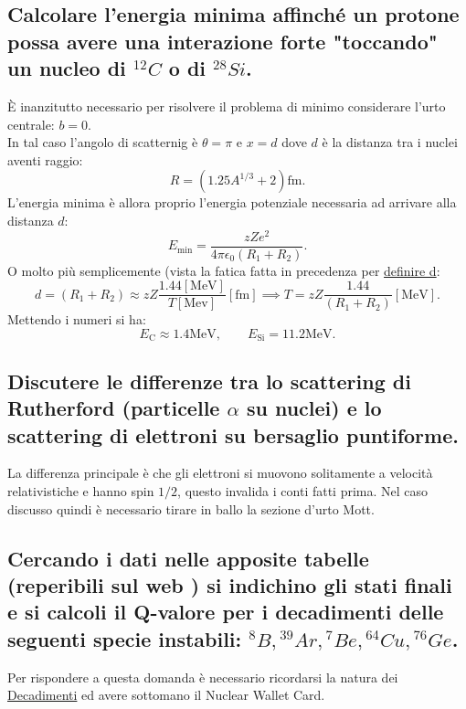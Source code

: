 \subsection[\hspace{2mm} Esempi di energia minima per far fare l'interazione forte al protone]{Calcolare l'energia minima affinché un protone possa avere una interazione forte "toccando" un nucleo di ${}^{12}C$ o di ${}^{28} Si$.}
È inanzitutto necessario per risolvere il problema di minimo considerare l'urto centrale: $b = 0$.\\ 
In tal caso l'angolo di scatternig è $\theta = \pi$ e $x = d$ dove $d$ è la distanza tra i nuclei aventi raggio:
\[
	R = \left( 1.25 A^{1 /3} + 2 \right) \text{fm} 
.\] 
L'energia minima è allora proprio l'energia potenziale necessaria ad arrivare alla distanza $d$:
 \[
	 E_{\text{min}} = \frac{zZe^2}{4 \pi \epsilon_0 \left( R_1 + R_2 \right) } 
.\] 
O molto più semplicemente (vista la fatica fatta in precedenza per \hyperref[eq:d-rutherford]{definire d}:
\[
	d = \left( R_1 + R_2 \right) \approx zZ\frac{1.44 [\text{MeV}]}{T[\text{Mev}] } [\text{fm}] \implies T = zZ\frac{1.44}{\left( R_1+R_2\right) } [\text{MeV}]
.\] 
Mettendo i numeri si ha:
\[
E_{\text{C}} \approx 1.4 \text{MeV} ,\quad \quad 
E_{\text{Si}} = 11.2 \text{MeV}
.\] 

\subsection[\hspace{2mm} Differenze tra Scattering Rutherford e Mott]{Discutere le differenze tra lo scattering di Rutherford (particelle $\alpha$ su nuclei) e lo scattering di elettroni su bersaglio puntiforme.}
La differenza principale è che gli elettroni si muovono solitamente a velocità relativistiche e hanno spin $1 /2$, questo invalida i conti fatti prima. Nel caso discusso quindi è necessario tirare in ballo la sezione d'urto Mott.

\subsection[\hspace{2mm} Stato finale di alcuni decadimenti a partire da particella antenato]{Cercando i dati nelle apposite tabelle (reperibili sul web ) si indichino gli stati finali e si calcoli il Q-valore per i decadimenti delle seguenti specie instabili: ${}^8B, {}^{39}Ar, {}^{7}Be, {}^{64}Cu, {}^{76}Ge$. }
Per rispondere a questa domanda è necessario ricordarsi la natura dei \hyperref[sec:decadimenti]{Decadimenti} ed avere sottomano il Nuclear Wallet Card.
